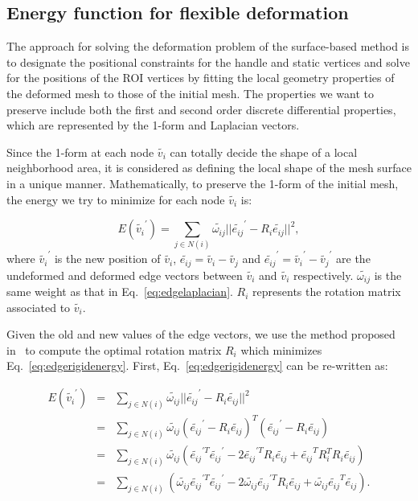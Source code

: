 \subsection{Energy function for flexible deformation} The approach
for solving  the deformation problem of the surface-based method is
to designate the positional constraints for the handle and static
vertices and solve for the positions of the ROI vertices by fitting
the local geometry properties of the deformed mesh to those of the
initial mesh. The properties we want to preserve include both the
first and second order discrete differential properties, which are
represented by the 1-form and Laplacian vectors.

Since the 1-form at each node $\tilde{v_i}$ can  totally decide the
shape of a local neighborhood area, it is considered as defining the
local shape of the mesh surface in a unique manner. Mathematically,
to preserve the 1-form of the initial mesh, the energy we try to
minimize for each node $\tilde{v_i}$ is:

\begin{equation}
\label{eq:edgerigidenergy}
E(\tilde{v_i}^\prime)=\sum\limits_{j\in N(i)}{\tilde{\omega_{ij}} ||\tilde{e_{ij}}^\prime -R_i \tilde{e_{ij}}||^2},
\end{equation}
where $\tilde{v_i}^\prime$ is the new  position of $\tilde{v_i}$,
$\tilde{e_{ij}}=\tilde{v_i}-\tilde{v_j}$ and
$\tilde{e_{ij}}^\prime=\tilde{v_i}^\prime-\tilde{v_j}^\prime$ are
the undeformed and deformed edge vectors between $\tilde{v_i}$ and
$\tilde{v_i}$ respectively. $\tilde{\omega_{ij}}$ is the same weight
as that in Eq.~\ref{eq:edgelaplacian}. $R_i$ represents the rotation
matrix associated to $\tilde{v_i}$.

Given the old and new values of the edge vectors, we use the method
proposed in~\cite{SA07} to compute the optimal rotation matrix $R_i$
which minimizes Eq.~\ref{eq:edgerigidenergy}. First, Eq.~\ref{eq:edgerigidenergy}
can be re-written as:

\begin{eqnarray}
\label{eq:rotationmat}
E(\tilde{v_i}^\prime) &=& \sum\limits_{j\in N(i)}{\tilde{\omega_{ij}} ||\tilde{e_{ij}}^\prime -R_i \tilde{e_{ij}}||^2}\nonumber\\
&=& \sum\limits_{j\in N(i)}{\tilde{\omega_{ij}} (\tilde{e_{ij}}^\prime -R_i \tilde{e_{ij}})^T
(\tilde{e_{ij}}^\prime -R_i \tilde{e_{ij}})}\nonumber\\
&=&\sum\limits_{j\in N(i)}{\tilde{\omega_{ij}} (\tilde{e_{ij}}^{\prime T}\tilde{e_{ij}}^\prime
-2\tilde{e_{ij}}^{\prime T}R_i\tilde{e_{ij}}+\tilde{e_{ij}}^T R_i^T R_i \tilde{e_{ij}})}\nonumber\\
&=&\sum\limits_{j\in N(i)}{(\tilde{\omega_{ij}} \tilde{e_{ij}}^{\prime T}\tilde{e_{ij}}^\prime
-2\tilde{\omega_{ij}} \tilde{e_{ij}}^{\prime T}R_i\tilde{e_{ij}}
+\tilde{\omega_{ij}} \tilde{e_{ij}}^T \tilde{e_{ij}})}.
\end{eqnarray}

